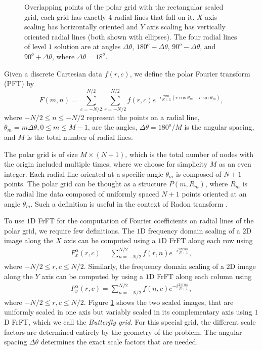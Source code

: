 \documentclass{UCF_ETD}
\begin{document}
\begin{figure}[H]
\begin{center}
 \caption{Overlapping points of the polar grid with the rectangular scaled grid, each grid has exactly $4$ radial lines that fall on it. $X$ axis scaling has horizontally oriented and $Y$ axis scaling has vertically oriented radial lines (both shown with ellipses). The four radial lines of level $1$ solution are at angles $\Delta \theta$, $180^o - \Delta \theta$,  $90^o - \Delta \theta$, and  $90^o + \Delta \theta$, where $\Delta \theta = 18^o$. }
 \label{Square_PolarTransformation.fig}
 \end{center}
 \end{figure}
 Given a discrete Cartesian data $f(r,c)$, we define the polar Fourier transform (PFT) by %
 \begin{equation}\label{DiscretePolarFourierTrans}
 F(m,n) = \sum\limits_{c=-N/2}^{N/2}\sum\limits_{r= -N/2}^{N/2} f(r,c)e^{-i\frac{2\pi n}{N+1}(r\cos \theta_m + c\sin\theta_m)},
 \end{equation}
 where $-N/2\leq n \leq -N/2$ represent the points on a radial line, $\theta_m = m\Delta \theta, 0 \leq m \leq M-1$, are the angles, $\Delta \theta = 180^o/M$ is the angular spacing, and $M$ is the total number of radial lines.
 
 The polar grid is  of size $M \times (N+1)$, which is the total number of nodes with the origin included multiple times, where we choose for simplicity $M$ as an even integer. Each radial line oriented at a specific angle $\theta_m$ is composed of $N + 1$ points. The polar grid can be thought as a structure $P( m, R_m)$, where $R_m$ is the radial line data composed of uniformly spaced $N + 1$ points oriented at an angle $\theta_m$. Such a definition is useful in the context of Radon transform \cite{Amir2001}.
 
 To  use  $1$D FrFT for the computation of Fourier coefficients on  radial lines of the polar grid, we require few definitions. The $1$D frequency domain scaling of a $2$D image along the $X$ axis can be computed using a $1$D FrFT along each row using
 \begin{eqnarray} \label{XSqueez2DFrFT}
 F^{\alpha}_x (r,c)   =  \sum\limits_{n=-N/2}^{N/2} f(r,n) e^{-i\frac{2\pi c\alpha n}{N+1}}, \end{eqnarray}
 where $ -N/2 \leq r, c \leq N/2$.
 Similarly, the frequency domain scaling of a $2$D image along the $Y$ axis can be computed by using a $1$D FrFT along each column using
 \begin{eqnarray} \label{YSqueez2DFrFT}
 F^{\alpha}_y (r,c) = \sum\limits_{n=-N/2}^{N/2} f(n,c) e^{-i\frac{2\pi r\alpha n}{N+1}},
 \end{eqnarray}
 where  $ -N/2 \leq r, c \leq N/2$. Figure \ref{Square_PolarTransformation.fig} shows the two scaled images, that are uniformly scaled in one axis but variably scaled in its complementary axis using $1$D FrFT, which we call the \emph{Butterfly grid}. For this special grid, the different scale factors are determined entirely by the geometry of the problem. The angular spacing $\Delta \theta$ determines the exact scale factors that are needed.
 
\end{document}
